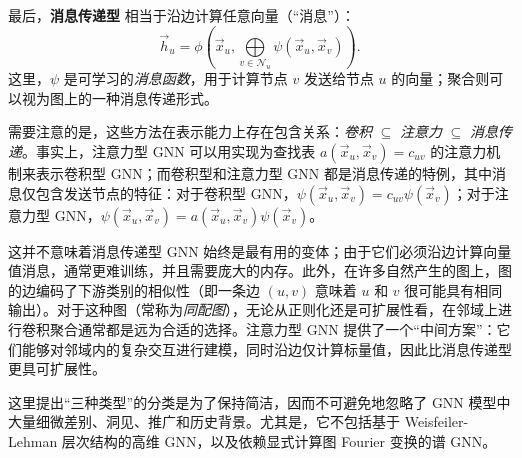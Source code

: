 最后，\textbf{消息传递型} \citep{gilmer2017neural,battaglia2018relational} 相当于沿边计算任意向量（“消息”）：
\begin{equation}
    \vec{h}_u = \phi\left(\vec{x}_u, \bigoplus\limits_{v\in\mathcal{N}_u}\psi(\vec{x}_u, \vec{x}_v)\right).
\end{equation}
这里，$\psi$ 是可学习的\emph{消息函数}，用于计算节点 $v$ 发送给节点 $u$ 的向量；聚合则可以视为图上的一种消息传递形式。


需要注意的是，这些方法在表示能力上存在包含关系：\emph{卷积} $\subseteq$ \emph{注意力} $\subseteq$ \emph{消息传递}。事实上，注意力型 GNN 可以用实现为查找表 $a(\vec{x}_u, \vec{x}_v) = c_{uv}$ 的注意力机制来表示卷积型 GNN；而卷积型和注意力型 GNN 都是消息传递的特例，其中消息仅包含发送节点的特征：对于卷积型 GNN，$\psi(\vec{x}_u, \vec{x}_v) = c_{uv}\psi(\vec{x}_v)$；对于注意力型 GNN，$\psi(\vec{x}_u, \vec{x}_v) = a(\vec{x}_u, \vec{x}_v)\psi(\vec{x}_v)$。
%

这并不意味着消息传递型 GNN 始终是最有用的变体；由于它们必须沿边计算向量值消息，通常更难训练，并且需要庞大的内存。此外，在许多自然产生的图上，图的边编码了下游类别的相似性（即一条边 $(u, v)$ 意味着 $u$ 和 $v$ 很可能具有相同输出）。对于这种图（常称为\emph{同配图}），无论从正则化还是可扩展性看，在邻域上进行卷积聚合通常都是远为合适的选择。注意力型 GNN 提供了一个“中间方案”：它们能够对邻域内的复杂交互进行建模，同时沿边仅计算标量值，因此比消息传递型更具可扩展性。


这里提出“三种类型”的分类是为了保持简洁，因而不可避免地忽略了 GNN 模型中大量细微差别、洞见、推广和历史背景。尤其是，它不包括基于 Weisfeiler-Lehman 层次结构的高维 GNN，以及依赖显式计算图 Fourier 变换的谱%
GNN。
%






